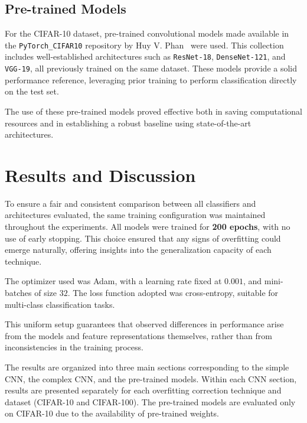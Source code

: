 \documentclass[journal,article,submit,pdftex,moreauthors]{Definitions/mdpi}
\begin{document}
\subsection{Pre-trained Models}
\label{sec:pretrained_models}

For the CIFAR-10 dataset, pre-trained convolutional models made available in the \texttt{PyTorch\_CIFAR10} repository by Huy V. Phan~\cite{huyvnphan_pytorch_cifar10} were used. This collection includes well-established architectures such as \texttt{ResNet-18}, \texttt{DenseNet-121}, and \texttt{VGG-19}, all previously trained on the same dataset. These models provide a solid performance reference, leveraging prior training to perform classification directly on the test set.

The use of these pre-trained models proved effective both in saving computational resources and in establishing a robust baseline using state-of-the-art architectures.

\section{Results and Discussion}
\label{sec:results}

To ensure a fair and consistent comparison between all classifiers and architectures evaluated, the same training configuration was maintained throughout the experiments. All models were trained for \textbf{200 epochs}, with no use of early stopping. This choice ensured that any signs of overfitting could emerge naturally, offering insights into the generalization capacity of each technique.

The optimizer used was Adam, with a learning rate fixed at $0.001$, and mini-batches of size $32$. The loss function adopted was cross-entropy, suitable for multi-class classification tasks. %

This uniform setup guarantees that observed differences in performance arise from the models and feature representations themselves, rather than from inconsistencies in the training process.

The results are organized into three main sections corresponding to the simple CNN, the complex CNN, and the pre-trained models. Within each CNN section, results are presented separately for each overfitting correction technique and dataset (CIFAR-10 and CIFAR-100). The pre-trained models are evaluated only on CIFAR-10 due to the availability of pre-trained weights.
\end{document}
